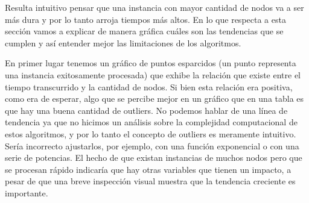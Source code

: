 Resulta intuitivo pensar que una instancia con mayor cantidad de nodos va a ser más dura y por lo tanto arroja tiempos más altos. En lo que respecta a esta sección vamos a explicar de manera gráfica cuáles son las tendencias que se cumplen y así entender mejor las limitaciones de los algoritmos. 

En primer lugar tenemos un gráfico de puntos esparcidos (un punto representa una instancia exitosamente procesada) que exhibe la relación que existe entre el tiempo transcurrido y la cantidad de nodos. Si bien esta relación era positiva, como era de esperar, algo que se percibe mejor en un gráfico que en una tabla es que hay una buena cantidad de outliers. No podemos hablar de una línea de tendencia ya que no hicimos un análisis sobre la complejidad computacional de estos algoritmos, y por lo tanto el concepto de outliers es meramente intuitivo. Sería incorrecto ajustarlos, por ejemplo, con una función exponencial o con una serie de potencias. El hecho de que existan instancias de muchos nodos pero que se procesan rápido indicaría que hay otras variables que tienen un impacto, a pesar de que una breve inspección visual muestra que la tendencia creciente es importante.    


